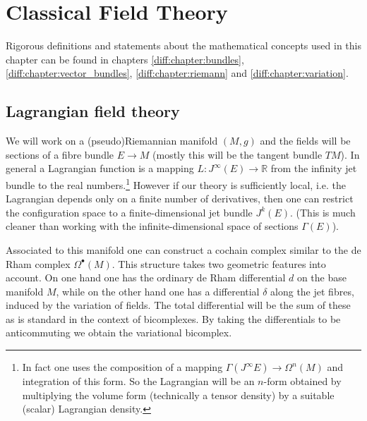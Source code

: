 \chapter{Classical Field Theory}\label{chapter:classical_fields}

	Rigorous definitions and statements about the mathematical concepts used in this chapter can be found in chapters \ref{diff:chapter:bundles}, \ref{diff:chapter:vector_bundles}, \ref{diff:chapter:riemann} and \ref{diff:chapter:variation}.

\section{Lagrangian field theory}

	We will work on a (pseudo)Riemannian manifold $(M, g)$ and the fields will be sections of a fibre bundle $E\rightarrow M$ (mostly this will be the tangent bundle $TM$). In general a Lagrangian function is a mapping $L:J^\infty(E)\rightarrow\mathbb{R}$ from the infinity jet bundle to the real numbers.\footnote{In fact one uses the composition of a mapping $\Gamma(J^\infty E)\rightarrow\Omega^n(M)$ and integration of this form. So the Lagrangian will be an $n$-form obtained by multiplying the volume form (technically a tensor density) by a suitable (scalar) Lagrangian density.} However if our theory is sufficiently local, i.e. the Lagrangian depends only on a finite number of derivatives, then one can restrict the configuration space to a finite-dimensional jet bundle $J^k(E)$. (This is much cleaner than working with the infinite-dimensional space of sections $\Gamma(E)$).
	
	Associated to this manifold one can construct a cochain complex similar to the de Rham complex $\Omega^\bullet(M)$. This structure takes two geometric features into account. On one hand one has the ordinary de Rham differential $d$ on the base manifold $M$, while on the other hand one has a differential $\delta$ along the jet fibres, induced by the variation of fields. The total differential will be the sum of these as is standard in the context of bicomplexes. By taking the differentials to be anticommuting we obtain the variational bicomplex.

